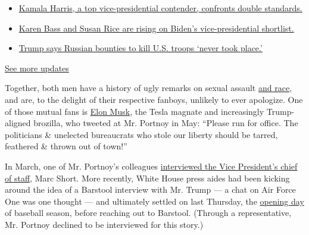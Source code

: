\begin{itemize}
\tightlist
\item
  \href{https://www.nytimes.com/2020/07/31/us/elections/biden-vs-trump.html?action=click\&pgtype=Article\&state=default\&region=MAIN_CONTENT_1\&context=storylines_live_updates\#link-29fdff45}{Kamala
  Harris, a top vice-presidential contender, confronts double
  standards.}
\item
  \href{https://www.nytimes.com/2020/07/31/us/elections/biden-vs-trump.html?action=click\&pgtype=Article\&state=default\&region=MAIN_CONTENT_1\&context=storylines_live_updates\#link-13ec3d9c}{Karen
  Bass and Susan Rice are rising on Biden's vice-presidential
  shortlist.}
\item
  \href{https://www.nytimes.com/2020/07/31/us/elections/biden-vs-trump.html?action=click\&pgtype=Article\&state=default\&region=MAIN_CONTENT_1\&context=storylines_live_updates\#link-49e9a016}{Trump
  says Russian bounties to kill U.S. troops `never took place.'}
\end{itemize}

\href{https://www.nytimes.com/2020/07/31/us/elections/biden-vs-trump.html?action=click\&pgtype=Article\&state=default\&region=MAIN_CONTENT_1\&context=storylines_live_updates}{See
more updates}

Together, both men have a history of ugly remarks on sexual assault
\href{https://www.nydailynews.com/sports/football/ny-barstool-sports-portnoy-racism-20200706-6qoawvrjbnce5cygbknhlp2wwe-story.html}{and
race}, and are, to the delight of their respective fanboys, unlikely to
ever apologize. One of those mutual fans is
\href{https://www.nytimes.com/2020/07/25/style/elon-musk-maureen-dowd.html}{Elon
Musk}, the Tesla magnate and increasingly Trump-aligned brozilla, who
tweeted at Mr. Portnoy in May: ``Please run for office. The politicians
\& unelected bureaucrats who stole our liberty should be tarred,
feathered \& thrown out of town!''

In March, one of Mr. Portnoy's colleagues
\href{https://www.barstoolsports.com/video/2198855/riggs-visits-white-house-grounds-for-coronavirus-interview-with-vp-chief-of-staff-marc-short}{interviewed
the Vice President's chief of staff}, Marc Short. More recently, White
House press aides had been kicking around the idea of a Barstool
interview with Mr. Trump --- a chat on Air Force One was one thought ---
and ultimately settled on last Thursday, the
\href{https://www.nytimes.com/2020/07/29/sports/baseball/mlb-season-coronavirus.html}{opening
day} of baseball season, before reaching out to Barstool. (Through a
representative, Mr. Portnoy declined to be interviewed for this story.)


